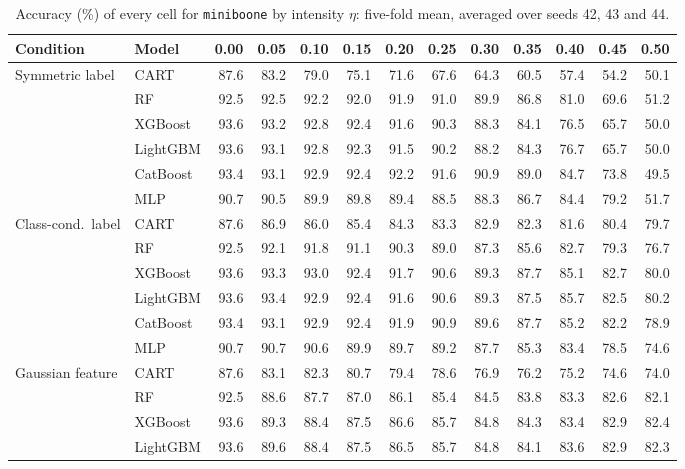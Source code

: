 \documentclass[pdflatex,sn-mathphys]{sn-jnl}
\theoremstyle{thmstyleone}
\begin{document}
\begin{table}[htbp]
\centering
\tiny
\setlength{\tabcolsep}{2.6pt}
\caption{Accuracy (\%) of every cell for \texttt{miniboone} by intensity $\eta$: five-fold mean, averaged over seeds 42, 43 and 44.}
\label{tab:grid_miniboone}
\begin{tabular}{@{}llrrrrrrrrrrr@{}}
\toprule
Condition & Model & 0.00 & 0.05 & 0.10 & 0.15 & 0.20 & 0.25 & 0.30 & 0.35 & 0.40 & 0.45 & 0.50 \\
\midrule
Symmetric label & CART & 87.6 & 83.2 & 79.0 & 75.1 & 71.6 & 67.6 & 64.3 & 60.5 & 57.4 & 54.2 & 50.1 \\
 & RF & 92.5 & 92.5 & 92.2 & 92.0 & 91.9 & 91.0 & 89.9 & 86.8 & 81.0 & 69.6 & 51.2 \\
 & XGBoost & 93.6 & 93.2 & 92.8 & 92.4 & 91.6 & 90.3 & 88.3 & 84.1 & 76.5 & 65.7 & 50.0 \\
 & LightGBM & 93.6 & 93.1 & 92.8 & 92.3 & 91.5 & 90.2 & 88.2 & 84.3 & 76.7 & 65.7 & 50.0 \\
 & CatBoost & 93.4 & 93.1 & 92.9 & 92.4 & 92.2 & 91.6 & 90.9 & 89.0 & 84.7 & 73.8 & 49.5 \\
 & MLP & 90.7 & 90.5 & 89.9 & 89.8 & 89.4 & 88.5 & 88.3 & 86.7 & 84.4 & 79.2 & 51.7 \\
\midrule
Class-cond.\ label & CART & 87.6 & 86.9 & 86.0 & 85.4 & 84.3 & 83.3 & 82.9 & 82.3 & 81.6 & 80.4 & 79.7 \\
 & RF & 92.5 & 92.1 & 91.8 & 91.1 & 90.3 & 89.0 & 87.3 & 85.6 & 82.7 & 79.3 & 76.7 \\
 & XGBoost & 93.6 & 93.3 & 93.0 & 92.4 & 91.7 & 90.6 & 89.3 & 87.7 & 85.1 & 82.7 & 80.0 \\
 & LightGBM & 93.6 & 93.4 & 92.9 & 92.4 & 91.6 & 90.6 & 89.3 & 87.5 & 85.7 & 82.5 & 80.2 \\
 & CatBoost & 93.4 & 93.1 & 92.9 & 92.4 & 91.9 & 90.9 & 89.6 & 87.7 & 85.2 & 82.2 & 78.9 \\
 & MLP & 90.7 & 90.7 & 90.6 & 89.9 & 89.7 & 89.2 & 87.7 & 85.3 & 83.4 & 78.5 & 74.6 \\
\midrule
Gaussian feature & CART & 87.6 & 83.1 & 82.3 & 80.7 & 79.4 & 78.6 & 76.9 & 76.2 & 75.2 & 74.6 & 74.0 \\
 & RF & 92.5 & 88.6 & 87.7 & 87.0 & 86.1 & 85.4 & 84.5 & 83.8 & 83.3 & 82.6 & 82.1 \\
 & XGBoost & 93.6 & 89.3 & 88.4 & 87.5 & 86.6 & 85.7 & 84.8 & 84.3 & 83.4 & 82.9 & 82.4 \\
 & LightGBM & 93.6 & 89.6 & 88.4 & 87.5 & 86.5 & 85.7 & 84.8 & 84.1 & 83.6 & 82.9 & 82.3 \\

\end{tabular}
\end{table}
\end{document}
